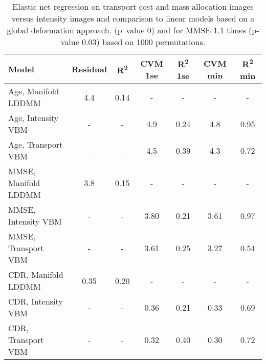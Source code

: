 
\begin{table}[h!]
\centering
\scriptsize
\begin{tabular}{l|cc|cccc}
  \parbox[b][2mm]{33mm}{Model}  & 
  \parbox[b][2mm]{11mm}{\centering Residual}  &
  \parbox[b][4mm]{7mm }{\centering R\textsuperscript{2} }    &
  \parbox[b][4mm]{7mm }{\centering CVM 1se }  & 
  \parbox[b][4mm]{7mm }{\centering R\textsuperscript{2}  1se} & 
  \parbox[b][4mm]{7mm }{\centering CVM min }  & 
  \parbox[b][4mm]{7mm }{\centering R\textsuperscript{2}  min} 
        \\ \hline \hline
  Age, Manifold LDDMM  & 4.4  & 0.14 & -    & -    & -    & -    \\
  Age, Intensity VBM   & -    & -    & 4.9  & 0.24 & 4.8  & 0.95 \\
  Age, Transport VBM   & -    & -    & 4.5  & 0.39 & 4.3  & 0.72 \\ \hline
  MMSE, Manifold LDDMM & 3.8  & 0.15 & -    & -    & -    & -    \\
  MMSE, Intensity VBM  & -    & -    & 3.80 & 0.21 & 3.61 & 0.97 \\
  MMSE, Transport VBM  & -    & -    & 3.61 & 0.25 & 3.27 & 0.54 \\ \hline
  CDR, Manifold LDDMM  & 0.35 & 0.20 & -    & -    & -    & -    \\
  CDR, Intensity VBM   & -    & -    & 0.36 & 0.21 & 0.33 & 0.69 \\
  CDR, Transport VBM   & -    & -    & 0.32 & 0.40 & 0.30 & 0.72 \\
\end{tabular} 
\caption{ \label{fig:prediction}  Elastic net regression on transport cost
and mass allocation images versus intensity images and comparison to linear
models based on a global deformation approach. (p--value 0) and for MMSE 1.1 times (p-value 0.03) based on 1000
permutations.} 
\vspace{-10mm}
\end{table}



